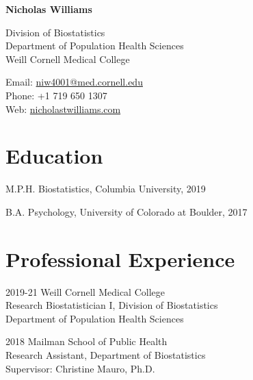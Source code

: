 \documentclass[12pt,letterpaper]{report}
\newcommand{\myname}{Nicholas Williams}
\newcommand{\namefont}[1]{{\normalfont\bfseries\Huge{#1}}}
\begin{document}
    \raggedright

    \namefont{\myname}

    \vspace{1em}
    \begin{minipage}[t]{0.64\textwidth}
        Division of Biostatistics \\
        Department of Population Health Sciences \\
        Weill Cornell Medical College
    \end{minipage}
    \begin{minipage}[t]{0.34\textwidth}
        Email: \href{mailto:niw4001@med.cornell.edu}{niw4001@med.cornell.edu} \\
        Phone: +1 719 650 1307 \\
        Web: \href{https://nicholastwilliams.com/}{nicholastwilliams.com}
    \end{minipage}
    \vspace{0.5em}

    \section*{Education}

    \begin{tablist}

        \item[M.P.H.]  \tab Biostatistics, Columbia University, 2019

        \item[B.A.]  \tab Psychology, University of Colorado at Boulder, 2017

    \end{tablist}

    \section*{Professional Experience}

    \begin{tablist}

        \item[2019-21]   \tab Weill Cornell Medical College \\
                             Research Biostatistician I, Division of Biostatistics \\
                             Department of Population Health Sciences 
        
        \item[2018]  \tab Mailman School of Public Health \\
                              Research Assistant, Department of Biostatistics \\
                              Supervisor: Christine Mauro, Ph.D.

    \end{tablist}
\end{document}
